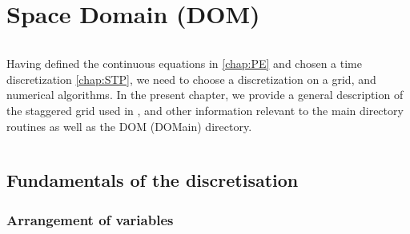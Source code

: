 \documentclass[../tex_main/NEMO_manual]{subfiles}
\begin{document}
\chapter{Space Domain (DOM)}
\label{chap:DOM}
\minitoc



\newpage
$\ $\newline    %

Having defined the continuous equations in \autoref{chap:PE} and chosen a time discretization \autoref{chap:STP},
we need to choose a discretization on a grid, and numerical algorithms.
In the present chapter, we provide a general description of the staggered grid used in \NEMO,
and other information relevant to the main directory routines as well as the DOM (DOMain) directory.

$\ $\newline    %

\section{Fundamentals of the discretisation}
\label{sec:DOM_basics}

\subsection{Arrangement of variables}
\label{subsec:DOM_cell}
\end{document}
